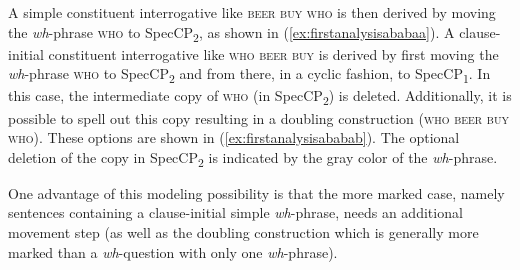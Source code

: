A simple constituent interrogative like \textsc{beer buy who} is then derived by moving the \textit{wh}-phrase \textsc{who} to SpecCP\textsubscript{2}, as shown in (\ref{ex:firstanalysisababaa}). A clause-initial constituent interrogative like \textsc{who beer buy} is derived by first moving the \textit{wh}-phrase \textsc{who} to SpecCP\textsubscript{2} and from there, in a cyclic fashion, to SpecCP\textsubscript{1}. In this case, the intermediate copy of \textsc{who} (in SpecCP\textsubscript{2}) is deleted. Additionally, it is possible to spell out this copy resulting in a doubling construction (\textsc{who beer buy who}). These options are shown in (\ref{ex:firstanalysisababab}). The optional deletion of the copy in SpecCP\textsubscript{2} is indicated by the gray color of the \textit{wh}-phrase.


One advantage of this modeling possibility is that the more marked case, namely sentences containing a clause-initial simple \textit{wh}-phrase, needs an additional movement step (as well as the doubling construction which is generally more marked than a \textit{wh}-question with only one \textit{wh}-phrase).

\clearpage




